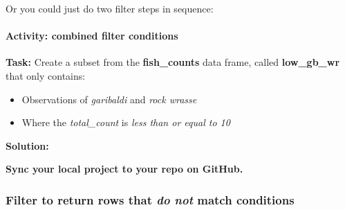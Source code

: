 \documentclass[]{book}
\newenvironment{Shaded}{\begin{snugshade}}{\end{snugshade}}
\newcommand{\CommentTok}[1]{\textcolor[rgb]{0.56,0.35,0.01}{\textit{#1}}}
\newcommand{\DecValTok}[1]{\textcolor[rgb]{0.00,0.00,0.81}{#1}}
\newcommand{\KeywordTok}[1]{\textcolor[rgb]{0.13,0.29,0.53}{\textbf{#1}}}
\newcommand{\NormalTok}[1]{#1}
\newcommand{\OperatorTok}[1]{\textcolor[rgb]{0.81,0.36,0.00}{\textbf{#1}}}
\newcommand{\StringTok}[1]{\textcolor[rgb]{0.31,0.60,0.02}{#1}}
\providecommand{\tightlist}{%
  \setlength{\itemsep}{0pt}\setlength{\parskip}{0pt}}
\let\oldparagraph\paragraph
\renewcommand{\paragraph}[1]{\oldparagraph{#1}\mbox{}}
\begin{document}
Or you could just do two filter steps in sequence:

\begin{Shaded}
\end{Shaded}

\hypertarget{activity-combined-filter-conditions}{%
\paragraph{Activity: combined filter conditions}\label{activity-combined-filter-conditions}}

\textbf{Task:} Create a subset from the \textbf{fish\_counts} data frame, called \textbf{low\_gb\_wr} that only contains:

\begin{itemize}
\tightlist
\item
  Observations of \emph{garibaldi} and \emph{rock wrasse}
\item
  Where the \emph{total\_count} is \emph{less than or equal to 10}
\end{itemize}

\textbf{Solution:}

\begin{Shaded}
\end{Shaded}

\textbf{Sync your local project to your repo on GitHub.}

\hypertarget{filter-to-return-rows-that-do-not-match-conditions}{%
\subsubsection{\texorpdfstring{Filter to return rows that \emph{do not} match conditions}{Filter to return rows that do not match conditions}}\label{filter-to-return-rows-that-do-not-match-conditions}}
\end{document}
